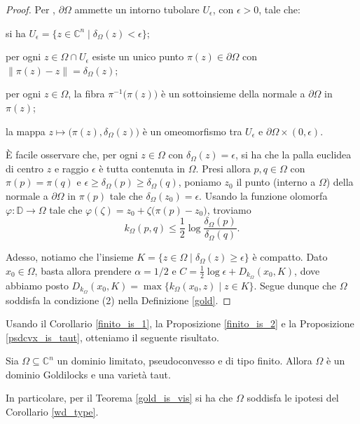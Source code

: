 \begin{proof}
    Per \cite[Chapter 9, Theorem 20]{S}, $\partial\Omega$ ammette un intorno tubolare $U_\epsilon$, con $\epsilon>0$, tale che:
    \begin{nlist}
        \item si ha $U_\epsilon=\{z\in\mathbb{C}^n\mid\delta_\Omega(z)<\epsilon\}$;
        \item per ogni $z\in\Omega\cap U_\epsilon$ esiste un unico punto $\pi(z)\in\partial\Omega$ con $\|\pi(z)-z\|=\delta_\Omega(z)$;
        \item per ogni $z\in\Omega$, la fibra $\pi^{-1}\big(\pi(z)\big)$ è un sottoinsieme della normale a $\partial\Omega$ in $\pi(z)$;
        \item la mappa $z\longmapsto\big(\pi(z),\delta_\Omega(z)\big)$ è un omeomorfismo tra $U_\epsilon$ e $\partial\Omega\times(0,\epsilon)$.
    \end{nlist}
    È facile osservare che, per ogni $z\in\Omega$ con $\delta_\Omega(z)=\epsilon$, si ha che la palla euclidea di centro $z$ e raggio $\epsilon$ è tutta contenuta in $\Omega$. Presi allora $p,q\in\Omega$ con $\pi(p)=\pi(q)$ e $\epsilon\ge\delta_\Omega(p)\ge\delta_\Omega(q)$, poniamo $z_0$ il punto (interno a $\Omega$) della normale a $\partial\Omega$ in $\pi(p)$ tale che $\delta_\Omega(z_0)=\epsilon$. Usando la funzione olomorfa $\varphi:\mathbb{D}\longrightarrow\Omega$ tale che $\varphi(\zeta)=z_0+\zeta\big(\pi(p)-z_0\big)$, troviamo
    $$k_\Omega(p,q) \le \dfrac{1}{2}\log{\dfrac{\delta_\Omega(p)}{\delta_\Omega(q)}}.$$

    Adesso, notiamo che l'insieme $K=\{z\in\Omega\mid\delta_\Omega(z)\ge\epsilon\}$ è compatto. Dato $x_0\in\Omega$, basta allora prendere $\alpha=1/2$ e $C=\frac{1}{2}\log{\epsilon}+D_{k_{\Omega}}(x_0,K)$, dove abbiamo posto $D_{k_\Omega}(x_0,K)=\max\{k_\Omega(x_0,z)\mid z\in K\}$. Segue dunque che $\Omega$ soddisfa la condizione (2) nella Definizione \ref{gold}.
\end{proof}

Usando il Corollario \ref{finito_is_1}, la Proposizione \ref{finito_is_2} e la Proposizione \ref{psdcvx_is_taut}, otteniamo il seguente risultato.

\begin{cor}
    Sia $\Omega\subseteq\mathbb{C}^n$ un dominio limitato, pseudoconvesso e di tipo finito. Allora $\Omega$ è un dominio Goldilocks e una varietà taut.
    
    In particolare, per il Teorema \ref{gold_is_vis} si ha che $\Omega$ soddisfa le ipotesi del Corollario \ref{wd_type}.
\end{cor}